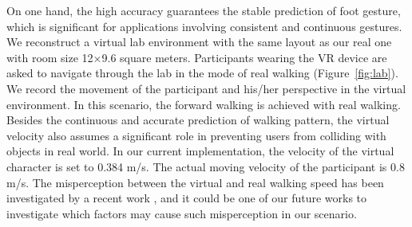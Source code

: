 \documentclass[review]{vgtc}                 %
\begin{document}
On one hand, the high accuracy guarantees the stable prediction of foot gesture, which is significant for applications involving consistent and continuous gestures. We reconstruct a virtual lab environment with the same layout as our real one with room size 12$\times$9.6 square meters. Participants wearing the VR device are asked to navigate through the lab in the mode of real walking (Figure~\ref{fig:lab}). We record the movement of the participant and his/her perspective in the virtual environment. In this scenario, the forward walking is achieved with real walking. 
Besides the continuous and accurate prediction of walking pattern, the virtual velocity also assumes a significant role in preventing users from colliding with objects in real world. 
In our current implementation, the velocity of the virtual character is set to 0.384 m/s. 
The actual moving velocity of the participant is 0.8 m/s. 
The misperception between the virtual and real walking speed has been investigated by a recent work \cite{nilsson2016perceived}, and it could be one of our future works to investigate which factors may cause such misperception in our scenario.
\end{document}
